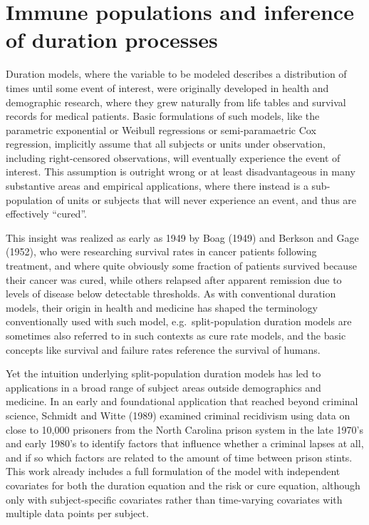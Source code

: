 \documentclass[article]{jss}
\begin{document}
\section{Immune populations and inference of duration
processes}\label{immune-populations-and-inference-of-duration-processes}

Duration models, where the variable to be modeled describes a
distribution of times until some event of interest, were originally
developed in health and demographic research, where they grew naturally
from life tables and survival records for medical patients. Basic
formulations of such models, like the parametric exponential or Weibull
regressions or semi-paramaetric Cox regression, implicitly assume that
all subjects or units under observation, including right-censored
observations, will eventually experience the event of interest. This
assumption is outright wrong or at least disadvantageous in many
substantive areas and empirical applications, where there instead is a
sub-population of units or subjects that will never experience an event,
and thus are effectively ``cured''.

This insight was realized as early as 1949 by Boag (1949) and Berkson
and Gage (1952), who were researching survival rates in cancer patients
following treatment, and where quite obviously some fraction of patients
survived because their cancer was cured, while others relapsed after
apparent remission due to levels of disease below detectable thresholds.
As with conventional duration models, their origin in health and
medicine has shaped the terminology conventionally used with such model,
e.g.~split-population duration models are sometimes also referred to in
such contexts as cure rate models, and the basic concepts like survival
and failure rates reference the survival of humans.

Yet the intuition underlying split-population duration models has led to
applications in a broad range of subject areas outside demographics and
medicine. In an early and foundational application that reached beyond
criminal science, Schmidt and Witte (1989) examined criminal recidivism
using data on close to 10,000 prisoners from the North Carolina prison
system in the late 1970's and early 1980's to identify factors that
influence whether a criminal lapses at all, and if so which factors are
related to the amount of time between prison stints. This work already
includes a full formulation of the model with independent covariates for
both the duration equation and the risk or cure equation, although only
with subject-specific covariates rather than time-varying covariates
with multiple data points per subject.
\end{document}
